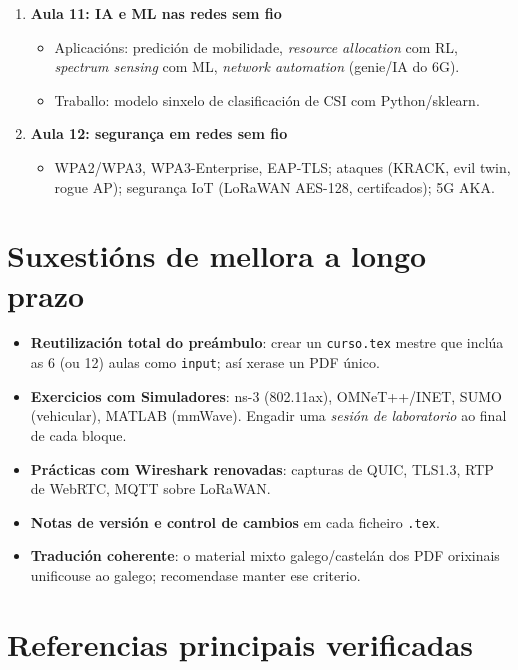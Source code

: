 \documentclass[11pt,a4paper]{article}
\begin{document}
\begin{enumerate}
  \item \textbf{Aula 11: IA e ML nas redes sem fio}
  \begin{itemize}
    \item Aplicacións: predición de mobilidade, \emph{resource allocation} com RL,
          \emph{spectrum sensing} com ML, \emph{network automation} (genie/IA do 6G).
    \item Traballo: modelo sinxelo de clasificación de CSI com Python/sklearn.
  \end{itemize}

  \item \textbf{Aula 12: segurança em redes sem fio}
  \begin{itemize}
    \item WPA2/WPA3, WPA3-Enterprise, EAP-TLS; ataques (KRACK, evil twin, rogue AP);
          segurança IoT (LoRaWAN AES-128, certifcados); 5G AKA.
  \end{itemize}
\end{enumerate}

\section{Suxestións de mellora a longo prazo}

\begin{itemize}
  \item \textbf{Reutilización total do preámbulo}: crear un \texttt{curso.tex} mestre
        que inclúa as 6 (ou 12) aulas como \texttt{input}; así xerase un PDF único.
  \item \textbf{Exercicios com Simuladores}: ns-3 (802.11ax), OMNeT++/INET,
        SUMO (vehicular), MATLAB (mmWave). Engadir uma \emph{sesión de laboratorio}
        ao final de cada bloque.
  \item \textbf{Prácticas com Wireshark renovadas}: capturas de QUIC, TLS1.3,
        RTP de WebRTC, MQTT sobre LoRaWAN.
  \item \textbf{Notas de versión e control de cambios} em cada ficheiro \texttt{.tex}.
  \item \textbf{Tradución coherente}: o material mixto galego/castelán dos PDF
        orixinais unificouse ao galego; recomendase manter ese criterio.
\end{itemize}

\section{Referencias principais verificadas}
\end{document}
